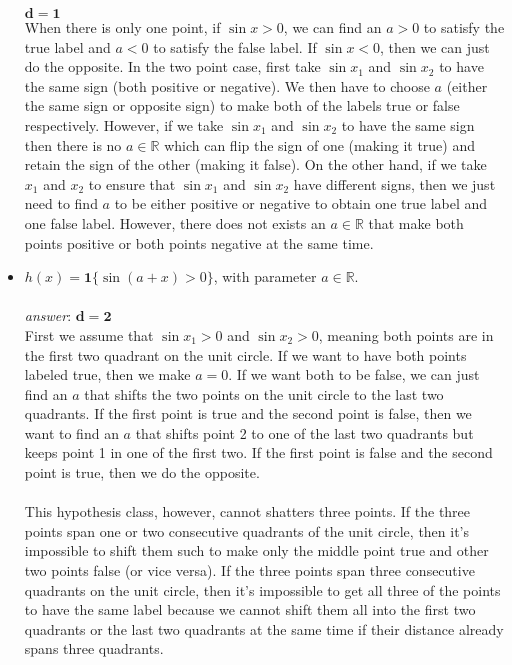 \documentclass{article}
\begin{document}
\begin{itemize}
    $\mathbf{d = 1}$\\When there is only one point, if $\sin x > 0$, we can find an $a>0$ to satisfy the true label and $a<0$ to satisfy the false label. If $\sin x<0$, then we can just do the opposite. In the two point case, first take $\sin x_1$ and $\sin x_2$ to have the same sign (both positive or negative). We then have to choose $a$ (either the same sign or opposite sign) to make both of the labels true or false respectively. However, if we take $\sin x_1$ and $\sin x_2$ to have the same sign then there is no $a\in \mathbb{R}$ which can flip the sign of one (making it true) and retain the sign of the other (making it false). On the other hand, if we take $x_1$ and $x_2$ to ensure that $\sin x_1$ and $\sin x_2$ have different signs, then we just need to find $a$ to be either positive or negative to obtain one true label and one false label. However, there does not exists an $a\in \mathbb{R}$ that make both points positive or both points negative at the same time.
    \item $h(x) = \mathbf{1}\{\sin(a+x)>0\}$, with parameter $a\in \mathbb{R}$.\\\\
    \textit{answer}: 
    $\mathbf{d = 2}$\\First we assume that $\sin x_1>0$ and $\sin x_2>0$, meaning both points are in the first two quadrant on the unit circle. If we want to have both points labeled true, then we make $a=0$. If we want both to be false, we can just find an $a$ that shifts the two points on the unit circle to the last two quadrants. If the first point is true and the second point is false, then we want to find an $a$ that shifts point 2 to one of the last two quadrants but keeps point 1 in one of the first two. If the first point is false and the second point is true, then we do the opposite. \\\\
    This hypothesis class, however, cannot shatters three points. If the three points span one or two consecutive quadrants of the unit circle, then it's impossible to shift them such to make only the middle point true and other two points false (or vice versa). If the three points span three consecutive quadrants on the unit circle, then it's impossible to get all three of the points to have the same label because we cannot shift them all into the first two quadrants or the last two quadrants at the same time if their distance already spans three quadrants. 
\end{itemize}
\end{document}
